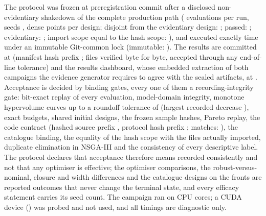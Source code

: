 The protocol was frozen at preregistration commit \texttt{\MdbPreregCommit} after a
disclosed non-evidentiary shakedown of the complete production path
(\MdbShakedownBudget{} evaluations per run, seeds \MdbShakedownSeeds,
\MdbShakedownDensePoints{} dense points per design; disjoint from the evidentiary
design: \MdbShakedownDisjoint; passed: \MdbShakedownPassed; evidentiary:
\MdbShakedownEvidentiary; import scope equal to the hash scope:
\MdbShakedownImportScopeMatches), and executed exactly \MdbAttemptCount{} time under an
immutable Git-common lock (immutable: \MdbLockImmutable). The results are committed at
\texttt{\MdbResultsCommit} (manifest hash prefix \texttt{\MdbManifestSha};
\MdbVerifiedFiles{} files verified byte for byte, \MdbToleratedEolFiles{} accepted
through any end-of-line tolerance) and the results dashboard, whose embedded extraction
of both campaigns the evidence generator requires to agree with the sealed artifacts,
at \texttt{\MdbDashboardCommit}. Acceptance is decided by \MdbGateCount{} binding
gates, every one of them a recording-integrity gate: bit-exact replay of every
evaluation, model-domain integrity, monotone hypervolume curves up to a roundoff
tolerance of \MdbHvMonotoneTolerance{} (largest recorded decrease
\MdbHvMonotoneLargestDecrease), exact budgets, shared initial designs, the frozen
sample hashes, Pareto replay, the code contract (hashed source prefix
\texttt{\MdbSourceSha}, protocol hash prefix \texttt{\MdbProtocolSha}; matches:
\MdbCodeContractMatches), the catalogue binding, the equality of the hash scope with
the files actually imported, duplicate elimination in NSGA-III and the consistency of
every descriptive label. The protocol declares that acceptance therefore means
recorded consistently and not that any optimiser is effective; the optimiser
comparisons, the robust-versus-nominal, closure and width differences and the
catalogue designs on the fronts are reported outcomes that never change the terminal
state, and every efficacy statement carries its seed count. The campaign ran on
\MdbCpuCount{} CPU cores; a CUDA device (\MdbCudaDevice) was probed and not used, and
all timings are diagnostic only.


